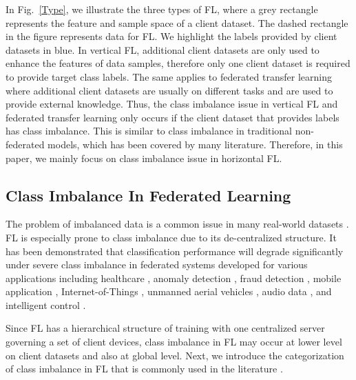 \documentclass[10pt,journal,compsoc]{IEEEtran}
\begin{document}
In Fig.~\ref{Type}, we illustrate the three types of FL, where a grey rectangle represents the feature and sample space of a client dataset. The dashed rectangle in the figure represents data for FL. We highlight the labels provided by client datasets in blue. In vertical FL, additional client datasets are only used to enhance the features of data samples, therefore only one client dataset is required to provide target class labels. The same applies to federated transfer learning where additional client datasets are usually on different tasks and are used to provide external knowledge. Thus, the class imbalance issue in vertical FL and federated transfer learning only occurs if the client dataset that provides labels has class imbalance. This is similar to class imbalance in traditional non-federated models, which has been covered by many literature. Therefore, in this paper, we mainly focus on class imbalance issue in horizontal FL.

\subsection{Class Imbalance In Federated Learning}
The problem of imbalanced data is a common issue in many real-world datasets \cite{choudhury2019predicting} \cite{xiao2021experimental}. FL is especially prone to class imbalance due to its de-centralized structure. It has been demonstrated that classification performance will degrade significantly under severe class imbalance in federated systems developed for various applications including healthcare \cite{li2021fedrs} \cite{hahn2019privacy} \cite{huang2019patient} \cite{hauschild2022federated}, anomaly detection \cite{shingi2020federated} \cite{cheng2022class} \cite{cheng2022blockchain} \cite{geng2022bearing}, fraud detection \cite{zheng2021federated} \cite{yang2019ffd}, mobile application\cite{duan2019astraea} \cite{duan2020self}, Internet-of-Things \cite{nguyen2020efficient} \cite{yu2020learning},  unmanned aerial vehicles \cite{mrad2021federated}, audio data \cite{green2021federated}, and intelligent control \cite{hua2020blockchain}. 

Since FL has a hierarchical structure of training with one centralized server governing a set of client devices, class imbalance in FL may occur at lower level on client datasets and also at global level. Next, we introduce the categorization of class imbalance in FL that is commonly used in the literature \cite{duan2019astraea}. 
\end{document}
